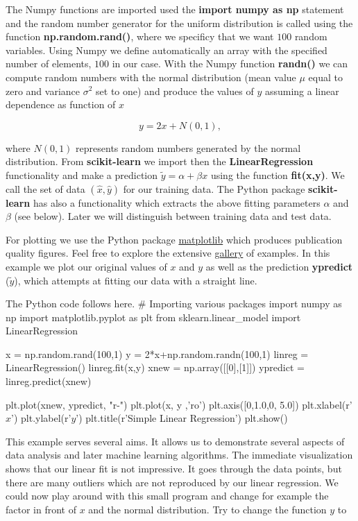 \documentclass[%
oneside,                 %
final,                   %
10pt]{article}
\begin{document}
The Numpy functions are imported used the \textbf{import numpy as np}
statement and the random number generator for the uniform distribution
is called using the function \textbf{np.random.rand()}, where we specificy
that we want $100$ random variables.  Using Numpy we define
automatically an array with the specified number of elements, $100$ in
our case.  With the Numpy function \textbf{randn()} we can compute random
numbers with the normal distribution (mean value $\mu$ equal to zero and
variance $\sigma^2$ set to one) and produce the values of $y$ assuming a linear
dependence as function of $x$

\[
y = 2x+N(0,1),
\]

where $N(0,1)$ represents random numbers generated by the normal
distribution.  From \textbf{scikit-learn} we import then the
\textbf{LinearRegression} functionality and make a prediction $\tilde{y} =
\alpha + \beta x$ using the function \textbf{fit(x,y)}. We call the set of
data $(\hat{x},\hat{y})$ for our training data. The Python package
\textbf{scikit-learn} has also a functionality which extracts the above
fitting parameters $\alpha$ and $\beta$ (see below). Later we will
distinguish between training data and test data.

For plotting we use the Python package
\href{{https://matplotlib.org/}}{matplotlib} which produces publication
quality figures. Feel free to explore the extensive
\href{{https://matplotlib.org/gallery/index.html}}{gallery} of examples. In
this example we plot our original values of $x$ and $y$ as well as the
prediction \textbf{ypredict} ($\tilde{y}$), which attempts at fitting our
data with a straight line.

The Python code follows here.
\bpycod
# Importing various packages
import numpy as np
import matplotlib.pyplot as plt
from sklearn.linear_model import LinearRegression

x = np.random.rand(100,1)
y = 2*x+np.random.randn(100,1)
linreg = LinearRegression()
linreg.fit(x,y)
xnew = np.array([[0],[1]])
ypredict = linreg.predict(xnew)

plt.plot(xnew, ypredict, "r-")
plt.plot(x, y ,'ro')
plt.axis([0,1.0,0, 5.0])
plt.xlabel(r'$x$')
plt.ylabel(r'$y$')
plt.title(r'Simple Linear Regression')
plt.show()
\epycod

This example serves several aims. It allows us to demonstrate several
aspects of data analysis and later machine learning algorithms. The
immediate visualization shows that our linear fit is not
impressive. It goes through the data points, but there are many
outliers which are not reproduced by our linear regression.  We could
now play around with this small program and change for example the
factor in front of $x$ and the normal distribution.  Try to change the
function $y$ to
\end{document}
